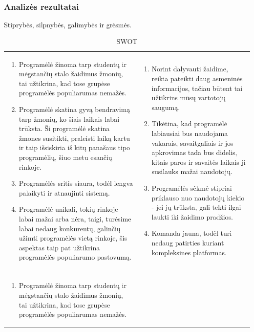 \documentclass{VUMIFPSkursinis}
\begin{document}
		\subsubsection{Analizės rezultatai}
			Stiprybės, silpnybės, galimybės ir grėsmės.		
			\begin{longtable}{ | m{8cm} | m{8cm} | }
			\caption{SWOT}
			\label{variability_impl_mech}
			\endhead
			 \hline			

			\centering{\textbf{Stiprybės}} & \centering{\textbf{Silpnybės}} \tabularnewline \hline
				\begin{enumerate}
					\item Programėlė žinoma tarp studentų ir mėgstančių stalo žaidimus žmonių, tai užtikrina, kad tose grupėse programėlės populiarumas nemažės.
					\item Programėlė skatina gyvą bendravimą tarp žmonių, ko šiais laikais labai trūksta. Ši programėlė skatina žmones susitikti, praleisti laiką kartu ir taip išsiskiria iš kitų panašaus tipo programėlių, šiuo metu esančių rinkoje.
					\item Programėlės sritis siaura, todėl lengva palaikyti ir atnaujinti sistemą.
					\item Programėlė unikali, tokių rinkoje labai mažai arba nėra, taigi, turėsime labai nedaug konkurentų, galinčių užimti programėlės vietą rinkoje, šis aspektas taip pat užtikrina programėlės populiarumo pastovumą.
				\end{enumerate}
					& 
				\begin{enumerate}
					\item Norint dalyvauti žaidime, reikia pateikti daug asmeninės informacijos, tačiau būtent tai užtikrins mūsų vartotojų saugumą.
					\item Tikėtina, kad programėlė labiausiai bus naudojama vakarais, savaitgaliais ir jos apkrovimas tada bus didelis, kitais paros ir savaitės laikais ji susilauks mažai naudotojų.
					\item Programėlės sėkmė stipriai priklauso nuo naudotojų kiekio - jei jų trūksta, gali tekti ilgai laukti iki žaidimo pradžios. 
					\item Komanda jauna, todėl turi nedaug patirties kuriant kompleksines platformas.
				\end{enumerate}\tabularnewline \hline
			\centering{\textbf{Galimybės}} & \centering{\textbf{Grėsmės}} \tabularnewline \hline
				\begin{enumerate}
					\item Programėlė žinoma tarp studentų ir mėgstančių stalo žaidimus žmonių, tai užtikrina, kad tose grupėse programėlės populiarumas nemažės.

\end{enumerate}
\end{longtable}
\end{document}
